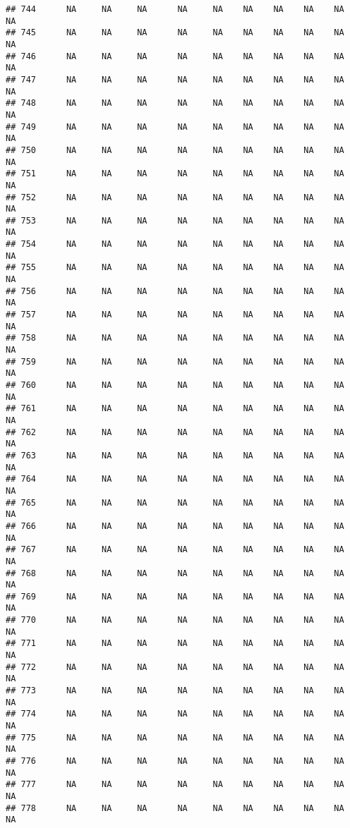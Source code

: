 \documentclass{article}\usepackage{graphicx, color}
\makeatletter
\newenvironment{kframe}{%
 \def\at@end@of@kframe{}%
 \ifinner\ifhmode%
  \def\at@end@of@kframe{\end{minipage}}%
  \begin{minipage}{\columnwidth}%
 \fi\fi%
 \def\FrameCommand##1{\hskip\@totalleftmargin \hskip-\fboxsep
 \colorbox{shadecolor}{##1}\hskip-\fboxsep
     \hskip-\linewidth \hskip-\@totalleftmargin \hskip\columnwidth}%
 \MakeFramed {\advance\hsize-\width
   \@totalleftmargin\z@ \linewidth\hsize
   \@setminipage}}%
 {\par\unskip\endMakeFramed%
 \at@end@of@kframe}
\newenvironment{knitrout}{}{} %
\makeatother
\begin{document}
\begin{knitrout}
\begin{kframe}
\begin{verbatim}
## 744      NA     NA     NA      NA     NA    NA    NA    NA    NA     NA
## 745      NA     NA     NA      NA     NA    NA    NA    NA    NA     NA
## 746      NA     NA     NA      NA     NA    NA    NA    NA    NA     NA
## 747      NA     NA     NA      NA     NA    NA    NA    NA    NA     NA
## 748      NA     NA     NA      NA     NA    NA    NA    NA    NA     NA
## 749      NA     NA     NA      NA     NA    NA    NA    NA    NA     NA
## 750      NA     NA     NA      NA     NA    NA    NA    NA    NA     NA
## 751      NA     NA     NA      NA     NA    NA    NA    NA    NA     NA
## 752      NA     NA     NA      NA     NA    NA    NA    NA    NA     NA
## 753      NA     NA     NA      NA     NA    NA    NA    NA    NA     NA
## 754      NA     NA     NA      NA     NA    NA    NA    NA    NA     NA
## 755      NA     NA     NA      NA     NA    NA    NA    NA    NA     NA
## 756      NA     NA     NA      NA     NA    NA    NA    NA    NA     NA
## 757      NA     NA     NA      NA     NA    NA    NA    NA    NA     NA
## 758      NA     NA     NA      NA     NA    NA    NA    NA    NA     NA
## 759      NA     NA     NA      NA     NA    NA    NA    NA    NA     NA
## 760      NA     NA     NA      NA     NA    NA    NA    NA    NA     NA
## 761      NA     NA     NA      NA     NA    NA    NA    NA    NA     NA
## 762      NA     NA     NA      NA     NA    NA    NA    NA    NA     NA
## 763      NA     NA     NA      NA     NA    NA    NA    NA    NA     NA
## 764      NA     NA     NA      NA     NA    NA    NA    NA    NA     NA
## 765      NA     NA     NA      NA     NA    NA    NA    NA    NA     NA
## 766      NA     NA     NA      NA     NA    NA    NA    NA    NA     NA
## 767      NA     NA     NA      NA     NA    NA    NA    NA    NA     NA
## 768      NA     NA     NA      NA     NA    NA    NA    NA    NA     NA
## 769      NA     NA     NA      NA     NA    NA    NA    NA    NA     NA
## 770      NA     NA     NA      NA     NA    NA    NA    NA    NA     NA
## 771      NA     NA     NA      NA     NA    NA    NA    NA    NA     NA
## 772      NA     NA     NA      NA     NA    NA    NA    NA    NA     NA
## 773      NA     NA     NA      NA     NA    NA    NA    NA    NA     NA
## 774      NA     NA     NA      NA     NA    NA    NA    NA    NA     NA
## 775      NA     NA     NA      NA     NA    NA    NA    NA    NA     NA
## 776      NA     NA     NA      NA     NA    NA    NA    NA    NA     NA
## 777      NA     NA     NA      NA     NA    NA    NA    NA    NA     NA
## 778      NA     NA     NA      NA     NA    NA    NA    NA    NA     NA

\end{verbatim}
\end{kframe}
\end{knitrout}
\end{document}
